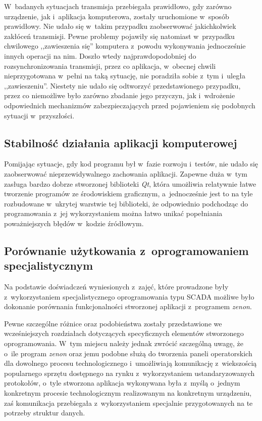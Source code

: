 W~badanych sytuacjach transmisja przebiegała prawidłowo, gdy zarówno urządzenie,
jak i~aplikacja komputerowa, zostały uruchomione w~sposób prawidłowy. Nie udało
się w~takim przypadku zaobserwować jakichkolwiek zakłóceń transmisji. Pewne
problemy pojawiły się natomiast w~przypadku chwilowego ,,zawieszenia się''
komputera z~powodu wykonywania jednocześnie innych operacji na nim. Doszło wtedy
najprawdopodobniej do rozsynchronizowania transmisji, przez co aplikacja,
w~obecnej chwili nieprzygotowana w~pełni na taką sytuację, nie poradziła sobie
z~tym i~uległa ,,zawieszeniu''. Niestety nie udało się odtworzyć przedstawionego
przypadku, przez co niemożliwe było zarówno zbadanie jego przyczyn, jak
i~wdrożenie odpowiednich mechanizmów zabezpieczających przed pojawieniem się
podobnych sytuacji w~przyszłości.

\subsection*{Stabilność działania aplikacji komputerowej}
\indent

Pomijając sytuacje, gdy kod programu był w~fazie rozwoju i~testów, nie udało się
zaobserwować nieprzewidywalnego zachowania aplikacji. Zapewne duża w~tym zasługa
bardzo dobrze stworzonej biblioteki \textit{Qt}, która umożliwia relatywnie
łatwe tworzenie programów ze środowiskiem graficznym, a~jednocześnie jest to na
tyle rozbudowane w~ukrytej warstwie tej biblioteki, że odpowiednio podchodząc do
programowania z~jej wykorzystaniem można łatwo unikać popełniania poważniejszych
błędów w~kodzie źródłowym.

\subsection*{Porównanie użytkowania z~oprogramowaniem specjalistycznym}
\indent

Na podstawie doświadczeń wyniesionych z~zajęć, które prowadzone były
z~wykorzystaniem specjalistycznego oprogramowania typu SCADA możliwe było
dokonanie porównania funkcjonalności stworzonej aplikacji z~programem
\textit{zenon}.

Pewne szczególne różnice oraz podobieństwa zostały przedstawione we
wcześniejszych rozdziałach dotyczących specyficznych elementów stworzonego
oprogramowania. W~tym miejscu należy jednak zwrócić szczególną uwagę, że o~ile
program \textit{zenon} oraz jemu podobne służą do tworzenia paneli operatorskich
dla dowolnego procesu technologicznego i~umożliwiają komunikację z~wiekszością
popularnego sprzętu dostępnego na rynku z~wykorzystaniem ustandaryzowanych
protokołów, o~tyle stworzona aplikacja wykonywana była z~myślą o~jednym
konkretnym procesie technologicznym realizowanym na konkretnym urządzeniu, zaś
komunikacja przebiegała z~wykorzystaniem specjalnie przygotowanych na te
potrzeby struktur danych.

